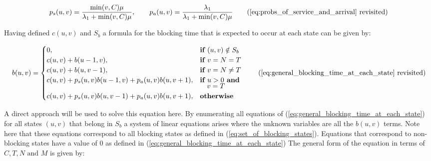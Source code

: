 \begin{equation*}
    p_s(u,v) = \frac{\min(v,C)\mu}{\lambda_1 + \min(v,C)\mu}, \qquad
    p_a(u,v) = \frac{\lambda_1}{\lambda_1 + \min(v,C)\mu}
    \tag{\ref{eq:probs_of_service_and_arrival} revisited} 
\end{equation*}


Having defined \(c(u,v)\) and \(S_b\) a formula for the blocking time that is
expected to occur at each state can be given by:

    \begin{equation*}
    b(u,v) = 
    \begin{cases} 
        0, & \textbf{if } (u,v) \notin S_b \\
        c(u,v) + b(u - 1, v), & \textbf{if } v = N = T\\
        c(u,v) + b(u, v-1), & \textbf{if } v = N \neq T \\
        c(u,v) + p_s(u,v) b(u-1, v) + p_a(u,v) b(u, v+1), & \textbf{if } u > 0 
        \textbf{ and } \vspace{-0.2cm} \\ 
        & \quad v = T \\
        c(u,v) + p_s(u,v) b(u, v-1) + p_a(u,v) b(u, v+1), & \textbf{otherwise} \\
    \end{cases}
    \tag{\ref{eq:general_blocking_time_at_each_state} revisited}
\end{equation*}

A direct approach will be used to solve this equation here. 
By enumerating all equations of (\ref{eq:general_blocking_time_at_each_state}) 
for all states \((u,v)\) that belong in \(S_b\) 
a system of linear equations arises where the unknown variables are all the 
\(b(u,v)\) terms. 
Note here that these equations correspond to all blocking states as defined in
(\ref{eq:set_of_blocking_states}). 
Equations that correspond to non-blocking states have a value of \(0\) as 
defined in (\ref{eq:general_blocking_time_at_each_state})
The general form of the equation in terms of \(C,T,N \text{ and } M\) is given by: 

